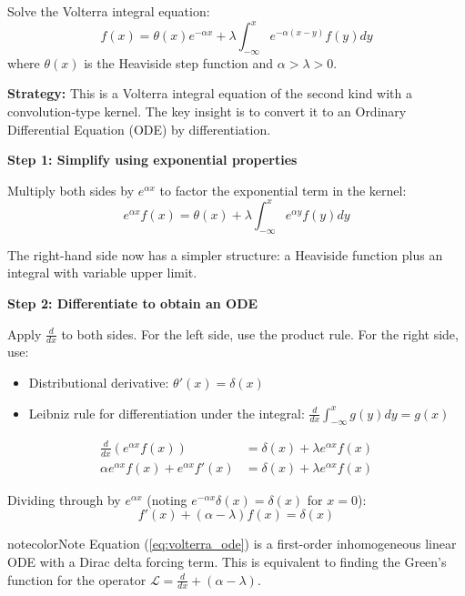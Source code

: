 \documentclass[a4paper,11pt]{article} %
\newenvironment{notebox}[1][]{\begin{custombox}[#1]{notecolor}{Note}}{\end{custombox}}
\begin{document}
\begin{problembox}
Solve the Volterra integral equation:
$$f(x) = \theta(x)e^{-\alpha x} + \lambda \int_{-\infty}^{x} e^{-\alpha(x-y)} f(y) dy$$
where $\theta(x)$ is the Heaviside step function and $\alpha > \lambda > 0$.
\end{problembox}

\textbf{Strategy:} This is a Volterra integral equation of the second kind with a convolution-type kernel. The key insight is to convert it to an Ordinary Differential Equation (ODE) by differentiation.

\textbf{Step 1: Simplify using exponential properties}

Multiply both sides by $e^{\alpha x}$ to factor the exponential term in the kernel:
\begin{equation}
    e^{\alpha x} f(x) = \theta(x) + \lambda \int_{-\infty}^{x} e^{\alpha y} f(y) dy
\end{equation}

The right-hand side now has a simpler structure: a Heaviside function plus an integral with variable upper limit.

\textbf{Step 2: Differentiate to obtain an ODE}

Apply $\frac{d}{dx}$ to both sides. For the left side, use the product rule. For the right side, use:
\begin{itemize}
    \item Distributional derivative: $\theta'(x) = \delta(x)$
    \item Leibniz rule for differentiation under the integral: $\frac{d}{dx}\int_{-\infty}^{x} g(y) dy = g(x)$
\end{itemize}

\begin{align}
    \frac{d}{dx} \left( e^{\alpha x} f(x) \right) &= \delta(x) + \lambda e^{\alpha x} f(x) \\
    \alpha e^{\alpha x} f(x) + e^{\alpha x} f'(x) &= \delta(x) + \lambda e^{\alpha x} f(x)
\end{align}

Dividing through by $e^{\alpha x}$ (noting $e^{-\alpha x}\delta(x) = \delta(x)$ for $x=0$):
\begin{equation}
    f'(x) + (\alpha - \lambda)f(x) = \delta(x)
    \label{eq:volterra_ode}
\end{equation}

\begin{notebox}
Equation (\ref{eq:volterra_ode}) is a first-order inhomogeneous linear ODE with a Dirac delta forcing term. This is equivalent to finding the Green's function for the operator $\mathcal{L} = \frac{d}{dx} + (\alpha - \lambda)$.
\end{notebox}
\end{document}
